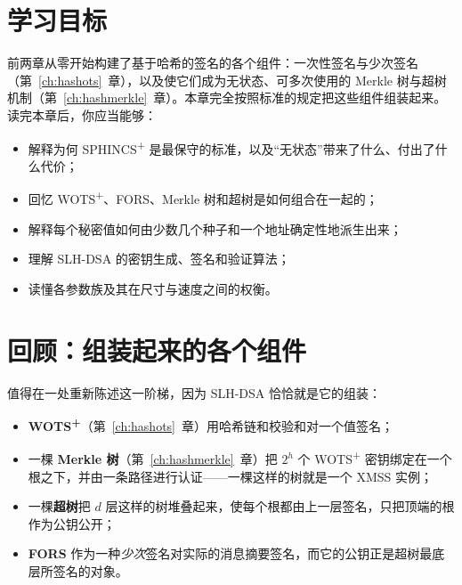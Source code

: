\section{学习目标}

前两章从零开始构建了基于哈希的签名的各个组件：一次性签名与少次签名（第~\ref{ch:hashots}~章），以及使它们成为无状态、可多次使用的 Merkle 树与超树机制（第~\ref{ch:hashmerkle}~章）。本章完全按照标准的规定把这些组件组装起来。读完本章后，你应当能够：

\begin{itemize}
  \item 解释为何 SPHINCS\textsuperscript{+} 是最保守的标准，以及“无状态”带来了什么、付出了什么代价；
  \item 回忆 WOTS\textsuperscript{+}、FORS、Merkle 树和超树是如何组合在一起的；
  \item 解释每个秘密值如何由少数几个种子和一个地址确定性地派生出来；
  \item 理解 SLH-DSA 的密钥生成、签名和验证算法；
  \item 读懂各参数族及其在尺寸与速度之间的权衡。
\end{itemize}

\section{回顾：组装起来的各个组件}
值得在一处重新陈述这一阶梯，因为 SLH-DSA 恰恰就是它的组装：

\begin{itemize}
  \item \textbf{WOTS\textsuperscript{+}}（第~\ref{ch:hashots}~章）用哈希链和校验和对一个值签名；
  \item 一棵 \textbf{Merkle 树}（第~\ref{ch:hashmerkle}~章）把 $2^h$ 个 WOTS\textsuperscript{+} 密钥绑定在一个根之下，并由一条路径进行认证——一棵这样的树就是一个 XMSS 实例；
  \item 一棵\textbf{超树}把 $d$ 层这样的树堆叠起来，使每个根都由上一层签名，只把顶端的根作为公钥公开；
  \item \textbf{FORS} 作为一种\emph{少次}签名对实际的消息摘要签名，而它的公钥正是超树最底层所签名的对象。
\end{itemize}


